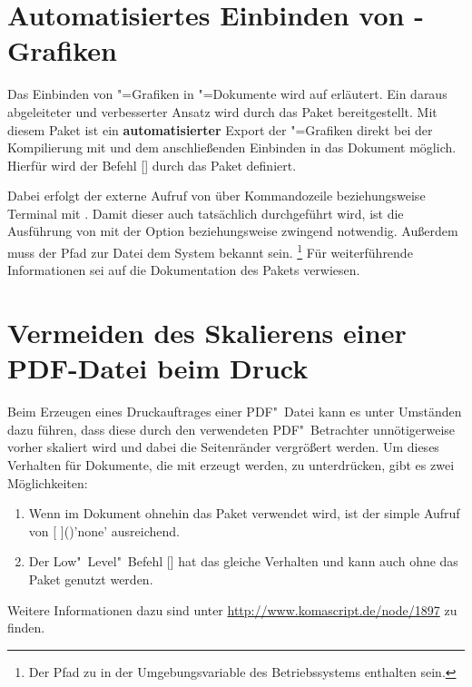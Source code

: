 \section{Automatisiertes Einbinden von -Grafiken }
%
%
%
Das Einbinden von "=Grafiken in "=Dokumente
wird auf  erläutert. Ein 
daraus abgeleiteter und verbesserter Ansatz wird durch das Paket  
bereitgestellt. Mit diesem Paket ist ein \textbf{automatisierter} Export der 
"=Grafiken direkt bei der Kompilierung mit  
und dem anschließenden Einbinden in das Dokument möglich. Hierfür wird der 
Befehl [] durch 
das Paket definiert.

Dabei erfolgt der externe Aufruf von  über Kommandozeile 
beziehungsweise Terminal mit . Damit dieser auch tatsächlich 
durchgeführt wird, ist die Ausführung von  mit der Option 
 beziehungsweise  zwingend 
notwendig. Außerdem muss der Pfad zur Datei  dem System 
bekannt sein.%
\footnote{%
  Der Pfad zu  in der Umgebungsvariable  des 
  Betriebssystems enthalten sein.%
}
Für weiterführende Informationen sei auf die Dokumentation des Pakets 
 verwiesen.



\section{Vermeiden des Skalierens einer PDF-Datei beim Druck}
%
Beim Erzeugen eines Druckauftrages einer PDF"~Datei kann es unter Umständen dazu 
führen, dass diese durch den verwendeten PDF"~Betrachter unnötigerweise vorher 
skaliert wird und dabei die Seitenränder vergrößert werden. Um dieses Verhalten 
für Dokumente, die mit  erzeugt werden, zu unterdrücken, gibt es 
zwei Möglichkeiten:
%
\begin{enumerate}
\item Wenn im Dokument ohnehin das Paket  verwendet wird, 
  ist der simple Aufruf von
  [%
  ]()'none'
  ausreichend.
\item Der Low"~Level"~Befehl
  []
  hat das gleiche Verhalten und kann auch ohne das Paket  
  genutzt werden.
\end{enumerate}
%
Weitere Informationen dazu sind unter \url{http://www.komascript.de/node/1897} 
zu finden.



